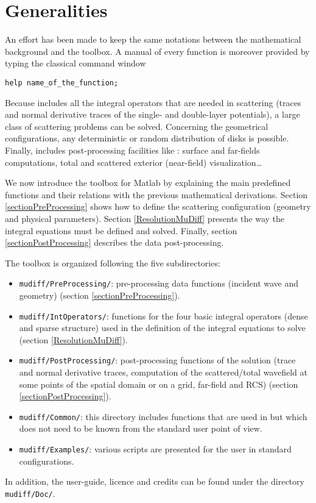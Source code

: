 \section{Generalities}
An effort has been made to keep the same notations between the mathematical background and the \mudiff toolbox. A manual of every function is moreover provided by typing the classical \matlab command window 
\begin{verbatim}
help name_of_the_function;
\end{verbatim}

Because \mudiff includes all the integral operators that are needed in scattering (traces and normal derivative
traces of the single- and double-layer potentials), a large class of scattering problems can be solved. 
Concerning the geometrical configurations, any deterministic or random distribution of disks is possible. Finally,
\mudiff includes post-processing facilities like \eg: surface and far-fields computations, total and scattered exterior (near-field)
visualization\ldots

We now introduce the \mudiff  toolbox for Matlab by explaining the main predefined functions and their relations
with the previous mathematical derivations.
Section \ref{sectionPreProcessing}  shows how to define the scattering configuration (geometry and physical parameters). Section
 \ref{ResolutionMuDiff}  presents the way the integral equations must be defined and solved.
  Finally, section \ref{sectionPostProcessing} describes the data post-processing. 

The \mudiff toolbox  is organized following the five subdirectories:
\begin{itemize}
\item \texttt{mudiff/PreProcessing/}: pre-processing data functions (incident wave and geometry) (section \ref{sectionPreProcessing}).
\item \texttt{mudiff/IntOperators/}: functions for the four basic integral operators (dense and sparse structure)
used in the definition of the integral equations to solve (section \ref{ResolutionMuDiff}). 
\item \texttt{mudiff/PostProcessing/}: post-processing functions of the solution (trace and normal derivative traces,
computation of the scattered/total wavefield 
at some points of the spatial domain or on a grid, far-field and RCS) 
(section \ref{sectionPostProcessing}).
\item \texttt{mudiff/Common/}: this directory includes functions that are used in \mudiff but which does not need to be known
from the standard user point of view.
\item \texttt{mudiff/Examples/}: various scripts are presented for the user in standard configurations.
\end{itemize}
In addition, the \mudiff user-guide, licence and credits can be found under the directory \texttt{mudiff/Doc/}.

